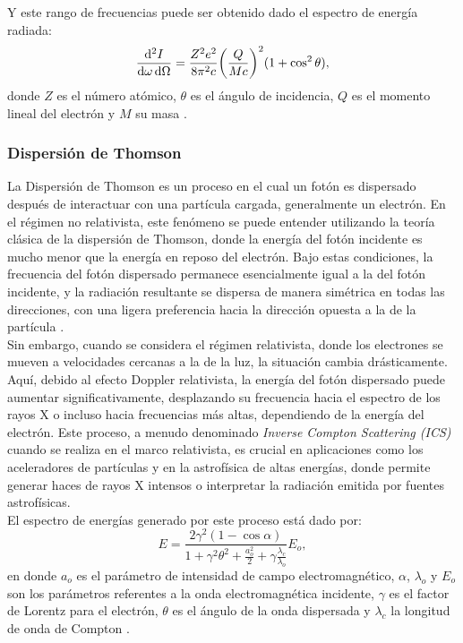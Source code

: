 Y este rango de frecuencias puede ser obtenido dado el espectro de energía radiada:
\begin{equation}
    \frac{\dd ^2 {I}}{\dd{\omega} \dd{\Omega}} = \frac{Z^2 e^2}{8\pi ^2 c} \qty(\frac{Q}{Mc})^2 (1 + \cos^2 \theta),
\end{equation}
donde $Z$ es el número atómico, $\theta$ es el ángulo de incidencia, $Q$ es el momento lineal del electrón y $M$ su masa \cite{jackson2021classical}.



\subsubsection{Dispersión de Thomson}
La Dispersión de Thomson es un proceso en el cual un fotón es dispersado después de interactuar con una partícula cargada, generalmente un electrón. En el régimen no relativista, este fenómeno se puede entender utilizando la teoría clásica de la dispersión de Thomson, donde la energía del fotón incidente es mucho menor que la energía en reposo del electrón. Bajo estas condiciones, la frecuencia del fotón dispersado permanece esencialmente igual a la del fotón incidente, y la radiación resultante se dispersa de manera simétrica en todas las direcciones, con una ligera preferencia hacia la dirección opuesta a la de la partícula \cite{corde2013femtosecond}. \\

Sin embargo, cuando se considera el régimen relativista, donde los electrones se mueven a velocidades cercanas a la de la luz, la situación cambia drásticamente. Aquí, debido al efecto Doppler relativista, la energía del fotón dispersado puede aumentar significativamente, desplazando su frecuencia hacia el espectro de los rayos X o incluso hacia frecuencias más altas, dependiendo de la energía del electrón. Este proceso, a menudo denominado \textit{Inverse Compton Scattering (ICS)} cuando se realiza en el marco relativista, es crucial en aplicaciones como los aceleradores de partículas y en la astrofísica de altas energías, donde permite generar haces de rayos X intensos o interpretar la radiación emitida por fuentes astrofísicas. \\

El espectro de energías generado por este proceso está dado por:
\begin{equation}
    E = \frac{2\gamma ^2 (1 - \cos{\alpha})}{1 + \gamma ^2 \theta ^2 + \frac{a_o ^2}{2} + \gamma \frac{\lambda _c}{\lambda _o}} E_o, \label{ICS}
\end{equation}
en donde $a_o$ es el parámetro de intensidad de campo electromagnético, $\alpha$, $\lambda _o$ y $E_o$ son los parámetros referentes a la onda electromagnética incidente, $\gamma$ es el factor de Lorentz para el electrón, $\theta$ es el ángulo de la onda dispersada y $\lambda _c$ la longitud de onda de Compton \cite{albert2023principles}.

